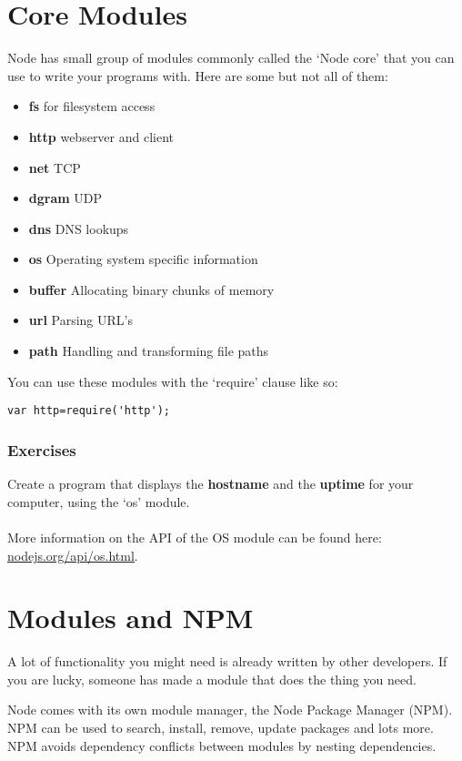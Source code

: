 \documentclass[a4paper]{report}
\begin{document}
\section*{Core Modules}
Node has small group of modules commonly called the `Node core' that you can use to write your programs with. Here are some but not all of them:
\begin{itemize}
	\item \textbf{fs} for filesystem access
	\item \textbf{http} webserver and client
	\item \textbf{net} TCP 
	\item \textbf{dgram} UDP
	\item \textbf{dns} DNS lookups
	\item \textbf{os} Operating system specific information
	\item \textbf{buffer} Allocating binary chunks of memory
	\item \textbf{url} Parsing URL's
	\item \textbf{path} Handling and transforming file paths
\end{itemize}

\noindent You can use these modules with the `require' clause like so: 
\begin{lstlisting}
var http=require('http');
\end{lstlisting}

\subsubsection*{Exercises}
Create a program that displays the \textbf{hostname} and the \textbf{uptime} for your computer, using the `os' module.\\
\\
\noindent More information on the API of the OS module can be found here: \href{http://nodejs.org/api/os.html}{nodejs.org/api/os.html}.

\section*{Modules and NPM}
A lot of functionality you might need is already written by other developers. If you are lucky, someone has made a module that does the thing you need. 

Node comes with its own module manager, the Node Package Manager (NPM). NPM can be used to search, install, remove, update packages and lots more. NPM avoids dependency conflicts between modules by nesting dependencies.
\end{document}
